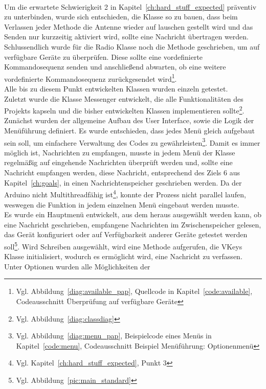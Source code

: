\documentclass[a4paper, 11pt]{scrartcl}
\begin{document}
\\
Um die erwartete Schwierigkeit 2 in Kapitel~\ref{ch:hard_stuff_expected} präventiv zu unterbinden, wurde sich entschieden, die Klasse so zu bauen, dass beim Verlassen
jeder Methode die Antenne wieder auf lauschen gestellt wird und das Senden nur kurzzeitig aktiviert wird, sollte eine Nachricht übertragen werden.
\\
Schlussendlich wurde für die \glqq Radio\grqq{} Klasse noch die Methode geschrieben, um auf verfügbare Geräte zu überprüfen. Diese sollte eine vordefinierte Kommandosequenz senden
und anschließend abwarten, ob eine weitere vordefinierte Kommandosequenz zurückgesendet 
wird\footnote{Vgl. Abbildung~\ref{diag:available_pap}, Quellcode in Kapitel~\ref{code:available}, Codeausschnitt \glqq Überprüfung auf verfügbare Geräte\grqq{}}.
\\
Alle bis zu diesem Punkt entwickelten Klassen wurden einzeln getestet.
\\
Zuletzt wurde die Klasse \glqq Messenger\grqq{} entwickelt, die alle Funktionalitäten des Projekts kapseln und die bisher entwickelten Klassen implementieren 
sollte\footnote{Vgl. Abbildung~\ref{diag:classdiag}}.
\\
Zunächst wurden der allgemeine Aufbau des User Interface, sowie die Logik der Menüführung definiert. Es wurde entschieden, dass jedes Menü gleich aufgebaut 
sein soll, um einfachere Verwaltung des Codes zu gewährleisten\footnote{Vgl. Abbildung~\ref{diag:menu_pap}, Beispielcode eines Menüs in Kapitel~\ref{code:menu}, 
Codeausschnitt \glqq Beispiel Menüführung: Optionenmenü\grqq{}}. Damit es immer möglich ist, Nachrichten zu empfangen, musste in jedem Menü der Klasse regelmäßig
auf eingehende Nachrichten überprüft werden und, sollte eine Nachricht empfangen werden, diese Nachricht, entsprechend des Ziels 6 aus Kapitel~\ref{ch:goals},
in einen Nachrichtenspeicher geschrieben werden. Da der Arduino nicht Multithreadfähig ist\footnote{Vgl. Kapitel~\ref{ch:hard_stuff_expected}, Punkt 3}, konnte der Prozess
nicht parallel laufen, weswegen die Funktion in jedem einzelnen Menü eingebaut werden musste.
\\
Es wurde ein Hauptmenü entwickelt, aus dem heraus ausgewählt werden kann, ob eine Nachricht geschrieben, empfangene Nachrichten im Zwischenspeicher gelesen, das Gerät konfiguriert
oder auf Verfügbarkeit anderer Geräte getestet werden soll\footnote{Vgl. Abbildung~\ref{pic:main_standard}}. Wird \glqq Schreiben\grqq{} ausgewählt, wird eine Methode aufgerufen,
die \glqq VKeys\grqq{} Klasse initialisiert, wodurch es ermöglicht wird, eine Nachricht zu verfassen. Unter \glqq Optionen\grqq{} wurden alle Möglichkeiten der 
\end{document}
